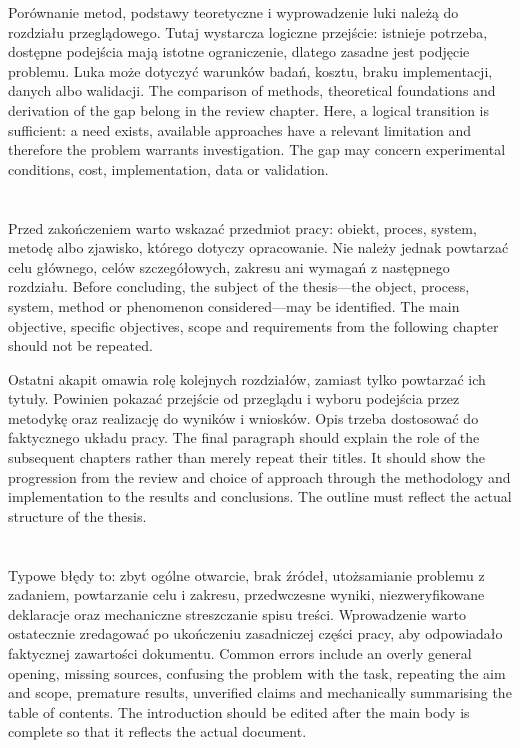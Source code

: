 \ploren
  {Porównanie metod, podstawy teoretyczne i wyprowadzenie luki należą do rozdziału przeglądowego. Tutaj wystarcza logiczne przejście: istnieje potrzeba, dostępne podejścia mają istotne ograniczenie, dlatego zasadne jest podjęcie problemu. Luka może dotyczyć warunków badań, kosztu, braku implementacji, danych albo walidacji.}
  {The comparison of methods, theoretical foundations and derivation of the gap belong in the review chapter. Here, a logical transition is sufficient: a need exists, available approaches have a relevant limitation and therefore the problem warrants investigation. The gap may concern experimental conditions, cost, implementation, data or validation.}

\section{}

\ploren
  {Przed zakończeniem warto wskazać przedmiot pracy: obiekt, proces, system, metodę albo zjawisko, którego dotyczy opracowanie. Nie należy jednak powtarzać celu głównego, celów szczegółowych, zakresu ani wymagań z następnego rozdziału.}
  {Before concluding, the subject of the thesis—the object, process, system, method or phenomenon considered—may be identified. The main objective, specific objectives, scope and requirements from the following chapter should not be repeated.}

\ploren
  {Ostatni akapit omawia rolę kolejnych rozdziałów, zamiast tylko powtarzać ich tytuły. Powinien pokazać przejście od przeglądu i wyboru podejścia przez metodykę oraz realizację do wyników i wniosków. Opis trzeba dostosować do faktycznego układu pracy.}
  {The final paragraph should explain the role of the subsequent chapters rather than merely repeat their titles. It should show the progression from the review and choice of approach through the methodology and implementation to the results and conclusions. The outline must reflect the actual structure of the thesis.}

\section{}

\ploren
  {Typowe błędy to: zbyt ogólne otwarcie, brak źródeł, utożsamianie problemu z zadaniem, powtarzanie celu i zakresu, przedwczesne wyniki, niezweryfikowane deklaracje oraz mechaniczne streszczanie spisu treści. Wprowadzenie warto ostatecznie zredagować po ukończeniu zasadniczej części pracy, aby odpowiadało faktycznej zawartości dokumentu.}
  {Common errors include an overly general opening, missing sources, confusing the problem with the task, repeating the aim and scope, premature results, unverified claims and mechanically summarising the table of contents. The introduction should be edited after the main body is complete so that it reflects the actual document.}

